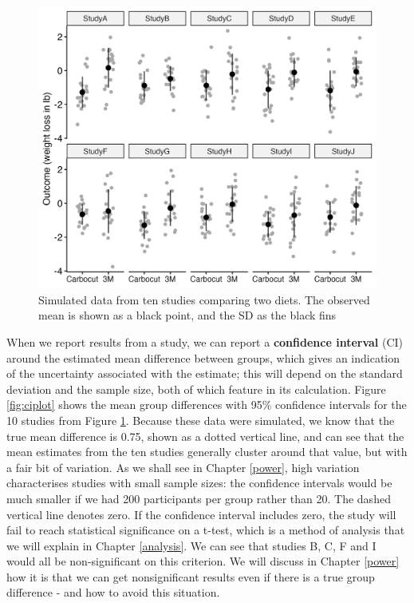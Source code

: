 \documentclass{krantz}
\begin{document}
\begin{figure}
\includegraphics[width=0.9\linewidth]{images_bw/carbo10gp} \caption{Simulated data from ten studies comparing two diets. The observed mean is shown as a black point, and the SD as the black fins}\label{fig:demo-variation2}
\end{figure}

When we report results from a study, we can report a \textbf{confidence interval} (CI) around the estimated mean difference between groups, which gives an indication of the uncertainty associated with the estimate; this will depend on the standard deviation and the sample size, both of which feature in its calculation. Figure \ref{fig:ciplot} shows the mean group differences with 95\% confidence intervals for the 10 studies from Figure \ref{fig:demo-variation2}. Because these data were simulated, we know that the true mean difference is 0.75, shown as a dotted vertical line, and can see that the mean estimates from the ten studies generally cluster around that value, but with a fair bit of variation. As we shall see in Chapter \ref{power}, high variation characterises studies with small sample sizes: the confidence intervals would be much smaller if we had 200 participants per group rather than 20. The dashed vertical line denotes zero. If the confidence interval includes zero, the study will fail to reach statistical significance on a t-test, which is a method of analysis that we will explain in Chapter \ref{analysis}. We can see that studies B, C, F and I would all be non-significant on this criterion. We will discuss in Chapter \ref{power} how it is that we can get nonsignificant results even if there is a true group difference - and how to avoid this situation.
\end{document}
